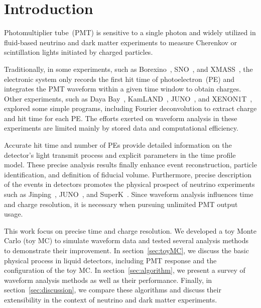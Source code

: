 \section{Introduction}
\label{sec:introduction}

Photomultiplier tube~(PMT) is sensitive to a single photon and widely utilized in fluid-based neutrino and dark matter experiments to measure Cherenkov or scintillation lights initiated by charged particles.

Traditionally, in some experiments, such as Borexino~\cite{lagomarsino_gateless_1999}, SNO~\cite{dunger_event_2019}, and XMASS~\cite{abe_xmass_2013}, the electronic system only records the first hit time of photoelectron~(PE) and integrates the PMT waveform within a given time window to obtain charges. Other experiments, such as Daya Bay~\cite{huang_flash_2018}, KamLAND~\cite{the_kamland_collaboration_production_2010}, JUNO~\cite{zhang_comparison_2019}, and XENON1T~\cite{aprile_xenon1t_2019}, explored some simple programs, including Fourier deconvolution to extract charge and hit time for each PE. The efforts exerted on waveform analysis in these experiments are limited mainly by stored data and computational efficiency. 

Accurate hit time and number of PEs provide detailed information on the detector's light transmit process and explicit parameters in the time profile model. These precise analysis results finally enhance event reconstruction, particle identification, and definition of fiducial volume. Furthermore, precise description of the events in detectors promotes the physical prospect of neutrino experiments such as Jinping~\cite{beacom_physics_2017}, JUNO~\cite{an_neutrino_2016}, and SuperK~\cite{noauthor_super-kamiokande_2003}. Since waveform analysis influences time and charge resolution, it is necessary when pursuing unlimited PMT output usage. 

This work focus on precise time and charge resolution. We developed a toy Monte Carlo (toy MC) to simulate waveform data and tested several analysis methods to demonstrate their improvement. In section~\ref{sec:toyMC}, we discuss the basic physical process in liquid detectors, including PMT response and the configuration of the toy MC. In section~\ref{sec:algorithm}, we present a survey of waveform analysis methods as well as their performance. Finally, in section~\ref{sec:discussion}, we compare these algorithms and discuss their extensibility in the context of neutrino and dark matter experiments. 
